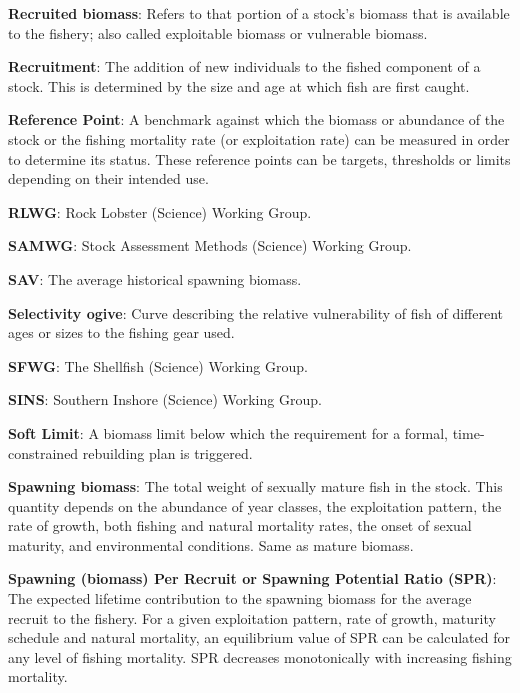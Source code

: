 \documentclass{mpi-plenary}
\theoremstyle{definition}
\theoremstyle{definition}
\theoremstyle{definition}
\theoremstyle{remark}
\begin{document}
\protect\hypertarget{def-recruited-biomass}{}{} \textbf{Recruited
biomass}: Refers to that portion of a stock's biomass that is available
to the fishery; also called exploitable biomass or vulnerable biomass.

\protect\hypertarget{def-recruitment}{}{} \textbf{Recruitment}: The
addition of new individuals to the fished component of a stock. This is
determined by the size and age at which fish are first caught.

\protect\hypertarget{def-reference-point}{}{} \textbf{Reference Point}:
A benchmark against which the biomass or abundance of the stock or the
fishing mortality rate (or exploitation rate) can be measured in order
to determine its status. These reference points can be targets,
thresholds or limits depending on their intended use.

\protect\hypertarget{def-rlwg}{}{} \textbf{RLWG}: Rock Lobster (Science)
Working Group.

\protect\hypertarget{def-samwg}{}{} \textbf{SAMWG}: Stock Assessment
Methods (Science) Working Group.

\protect\hypertarget{def-sav}{}{} \textbf{SAV}: The average historical
spawning biomass.

\protect\hypertarget{def-selectivity-ogive}{}{} \textbf{Selectivity
ogive}: Curve describing the relative vulnerability of fish of different
ages or sizes to the fishing gear used.

\protect\hypertarget{def-sfwg}{}{} \textbf{SFWG}: The Shellfish
(Science) Working Group.

\protect\hypertarget{def-sins}{}{} \textbf{SINS}: Southern Inshore
(Science) Working Group.

\protect\hypertarget{def-soft-limit}{}{} \textbf{Soft Limit}: A biomass
limit below which the requirement for a formal, time-constrained
rebuilding plan is triggered.

\protect\hypertarget{def-spawning-biomass}{}{} \textbf{Spawning
biomass}: The total weight of sexually mature fish in the stock. This
quantity depends on the abundance of year classes, the exploitation
pattern, the rate of growth, both fishing and natural mortality rates,
the onset of sexual maturity, and environmental conditions. Same as
mature biomass.

\protect\hypertarget{def-spawning-biomass-per-recruit-or-spawning-potential-ratio}{}{}
\textbf{Spawning (biomass) Per Recruit or Spawning Potential Ratio
(SPR)}: The expected lifetime contribution to the spawning biomass for
the average recruit to the fishery. For a given exploitation pattern,
rate of growth, maturity schedule and natural mortality, an equilibrium
value of SPR can be calculated for any level of fishing mortality. SPR
decreases monotonically with increasing fishing mortality.
\end{document}
